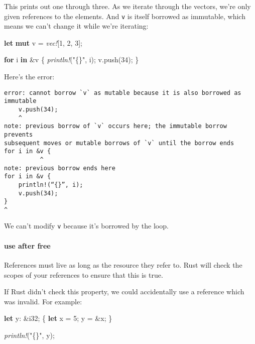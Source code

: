 \documentclass[a4paper,]{book}
\newenvironment{Shaded}{\begin{snugshade}}{\end{snugshade}}
\newcommand{\KeywordTok}[1]{\textcolor[rgb]{0.13,0.29,0.53}{\textbf{{#1}}}}
\newcommand{\DataTypeTok}[1]{\textcolor[rgb]{0.13,0.29,0.53}{{#1}}}
\newcommand{\DecValTok}[1]{\textcolor[rgb]{0.00,0.00,0.81}{{#1}}}
\newcommand{\StringTok}[1]{\textcolor[rgb]{0.31,0.60,0.02}{{#1}}}
\newcommand{\PreprocessorTok}[1]{\textcolor[rgb]{0.56,0.35,0.01}{\textit{{#1}}}}
\newcommand{\NormalTok}[1]{{#1}}
\let\oldparagraph\paragraph
\renewcommand{\paragraph}[1]{\oldparagraph{#1}\mbox{}}
\begin{document}
This prints out one through three. As we iterate through the vectors,
we're only given references to the elements. And \texttt{v} is itself
borrowed as immutable, which means we can't change it while we're
iterating:

\begin{Shaded}
\begin{Highlighting}[]
\KeywordTok{let} \KeywordTok{mut} \NormalTok{v = }\PreprocessorTok{vec!}\NormalTok{[}\DecValTok{1}\NormalTok{, }\DecValTok{2}\NormalTok{, }\DecValTok{3}\NormalTok{];}

\KeywordTok{for} \NormalTok{i }\KeywordTok{in} \NormalTok{&v \{}
    \PreprocessorTok{println!}\NormalTok{(}\StringTok{"\{\}"}\NormalTok{, i);}
    \NormalTok{v.push(}\DecValTok{34}\NormalTok{);}
\NormalTok{\}}
\end{Highlighting}
\end{Shaded}

Here's the error:

\begin{verbatim}
error: cannot borrow `v` as mutable because it is also borrowed as immutable
    v.push(34);
    ^
note: previous borrow of `v` occurs here; the immutable borrow prevents
subsequent moves or mutable borrows of `v` until the borrow ends
for i in &v {
          ^
note: previous borrow ends here
for i in &v {
    println!(“{}”, i);
    v.push(34);
}
^
\end{verbatim}

We can't modify \texttt{v} because it's borrowed by the loop.

\paragraph{use after free}\label{use-after-free}

References must live as long as the resource they refer to. Rust will
check the scopes of your references to ensure that this is true.

If Rust didn't check this property, we could accidentally use a
reference which was invalid. For example:

\begin{Shaded}
\begin{Highlighting}[]
\KeywordTok{let} \NormalTok{y: &}\DataTypeTok{i32}\NormalTok{;}
\NormalTok{\{ }
    \KeywordTok{let} \NormalTok{x = }\DecValTok{5}\NormalTok{;}
    \NormalTok{y = &x;}
\NormalTok{\}}

\PreprocessorTok{println!}\NormalTok{(}\StringTok{"\{\}"}\NormalTok{, y);}
\end{Highlighting}
\end{Shaded}
\end{document}
